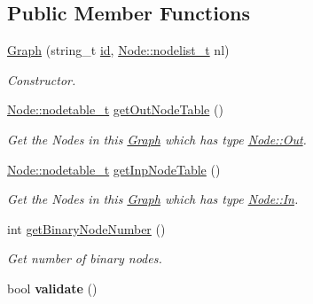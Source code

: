 \subsection*{Public Member Functions}
\begin{DoxyCompactItemize}
\item 
\hyperlink{class_d_f_p_1_1_graph_a3d04c060d5f07627211996e42e7819fc}{Graph} (string\+\_\+t \hyperlink{class_d_f_p_1_1_graph_aa5ed385b1f994f5220e0bb3d290bcfb8}{id}, \hyperlink{class_d_f_p_1_1_node_a9dc2ef0c0546df091e01cd0df2cc12d9}{Node\+::nodelist\+\_\+t} nl)
\begin{DoxyCompactList}\small\item\em Constructor. \end{DoxyCompactList}\item 
\hyperlink{class_d_f_p_1_1_node_af7bf8e098cd86639fba4160356704786}{Node\+::nodetable\+\_\+t} \hyperlink{class_d_f_p_1_1_graph_a808d6323d5d322df30dcf0703ea5e7fc}{get\+Out\+Node\+Table} ()\hypertarget{class_d_f_p_1_1_graph_a808d6323d5d322df30dcf0703ea5e7fc}{}\label{class_d_f_p_1_1_graph_a808d6323d5d322df30dcf0703ea5e7fc}

\begin{DoxyCompactList}\small\item\em Get the Nodes in this \hyperlink{class_d_f_p_1_1_graph}{Graph} which has type \hyperlink{class_d_f_p_1_1_node_a31d945c7278c3587d6d28c76b0f1ae81ae12934d1eab7d10d4dc8c50c99b765a1}{Node\+::\+Out}. \end{DoxyCompactList}\item 
\hyperlink{class_d_f_p_1_1_node_af7bf8e098cd86639fba4160356704786}{Node\+::nodetable\+\_\+t} \hyperlink{class_d_f_p_1_1_graph_ae045b3ed7d9b2d8da2804d09d34fe46d}{get\+Inp\+Node\+Table} ()\hypertarget{class_d_f_p_1_1_graph_ae045b3ed7d9b2d8da2804d09d34fe46d}{}\label{class_d_f_p_1_1_graph_ae045b3ed7d9b2d8da2804d09d34fe46d}

\begin{DoxyCompactList}\small\item\em Get the Nodes in this \hyperlink{class_d_f_p_1_1_graph}{Graph} which has type \hyperlink{class_d_f_p_1_1_node_a31d945c7278c3587d6d28c76b0f1ae81a8b0ac0a4d07f5860c156947aa7218adc}{Node\+::\+In}. \end{DoxyCompactList}\item 
int \hyperlink{class_d_f_p_1_1_graph_ac39aa15ae1dd24383da300d02b0ae0d1}{get\+Binary\+Node\+Number} ()\hypertarget{class_d_f_p_1_1_graph_ac39aa15ae1dd24383da300d02b0ae0d1}{}\label{class_d_f_p_1_1_graph_ac39aa15ae1dd24383da300d02b0ae0d1}

\begin{DoxyCompactList}\small\item\em Get number of binary nodes. \end{DoxyCompactList}\item 
bool {\bfseries validate} ()\hypertarget{class_d_f_p_1_1_graph_a19063fcb0841ddcd7330129081348e97}{}\label{class_d_f_p_1_1_graph_a19063fcb0841ddcd7330129081348e97}

\end{DoxyCompactItemize}
